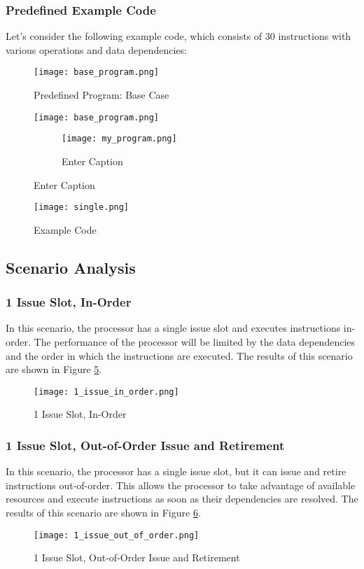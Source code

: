 \documentclass{article}
\begin{document}
\subsubsection{Predefined Example Code}
Let's consider the following example code, which consists of 30 instructions with various operations and data dependencies:
\begin{figure}[H]
    \centering
    \texttt{[image: base\_program.png]}
    \caption{Predefined Program: Base Case}
    \label{fig:base_program}
\end{figure}
\begin{figure}
    \centering
    \texttt{[image: base\_program.png]}
    \caption{Enter Caption}
\begin{figure}
        \centering
        \texttt{[image: my\_program.png]}
        \caption{Enter Caption}
        \label{fig:More programs}
    \end{figure}
        \label{fig:enter-label}
\end{figure}
\begin{figure}[H]
\centering
\texttt{[image: single.png]}
\caption{Example Code}
\label{fig:example_code}
\end{figure}
\subsection{Scenario Analysis}
\subsubsection{1 Issue Slot, In-Order}
In this scenario, the processor has a single issue slot and executes instructions in-order. The performance of the processor will be limited by the data dependencies and the order in which the instructions are executed. The results of this scenario are shown in Figure \ref{fig:1_issue_in_order}.
\begin{figure}[H]
\centering
\texttt{[image: 1\_issue\_in\_order.png]}
\caption{1 Issue Slot, In-Order}
\label{fig:1_issue_in_order}
\end{figure}
\subsubsection{1 Issue Slot, Out-of-Order Issue and Retirement}
In this scenario, the processor has a single issue slot, but it can issue and retire instructions out-of-order. This allows the processor to take advantage of available resources and execute instructions as soon as their dependencies are resolved. The results of this scenario are shown in Figure \ref{fig:1_issue_out_of_order}.
\begin{figure}[H]
\centering
\texttt{[image: 1\_issue\_out\_of\_order.png]}
\caption{1 Issue Slot, Out-of-Order Issue and Retirement}
\label{fig:1_issue_out_of_order}
\end{figure}
\end{document}
